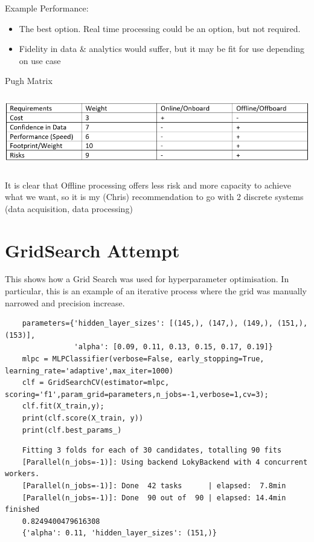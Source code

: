 \documentclass{UoNMCHA}
\numberwithin{equation}{section}
\begin{document}
{Example Performance:}

\begin{itemize}
\item
  The best option. Real time processing could be an option, but not
  required.
\item
  Fidelity in data \& analytics would suffer, but it may be fit for use
  depending on use case
\end{itemize}

Pugh Matrix

\includegraphics[width=6.21513in,height=1.25in]{Figures/pugh.png}

It is clear that Offline processing offers less risk and more capacity to
achieve what we want, so it is my (Chris) recommendation to go with 2
discrete systems (data acquisition, data processing)

\clearpage \section{GridSearch Attempt}\label{apx:GSAttempt}
This shows how a Grid Search was used for hyperparameter optimisation. In particular, this is an example of an iterative process where the grid was manually narrowed and precision increase. 
\begin{lstlisting}
    parameters={'hidden_layer_sizes': [(145,), (147,), (149,), (151,), (153)],
                'alpha': [0.09, 0.11, 0.13, 0.15, 0.17, 0.19]}
    mlpc = MLPClassifier(verbose=False, early_stopping=True, learning_rate='adaptive',max_iter=1000)
    clf = GridSearchCV(estimator=mlpc, scoring='f1',param_grid=parameters,n_jobs=-1,verbose=1,cv=3);
    clf.fit(X_train,y);
    print(clf.score(X_train, y))
    print(clf.best_params_)
\end{lstlisting}
\begin{lstlisting}
    Fitting 3 folds for each of 30 candidates, totalling 90 fits
    [Parallel(n_jobs=-1)]: Using backend LokyBackend with 4 concurrent workers.
    [Parallel(n_jobs=-1)]: Done  42 tasks      | elapsed:  7.8min
    [Parallel(n_jobs=-1)]: Done  90 out of  90 | elapsed: 14.4min finished
    0.8249400479616308
    {'alpha': 0.11, 'hidden_layer_sizes': (151,)}
\end{lstlisting}
\end{document}
